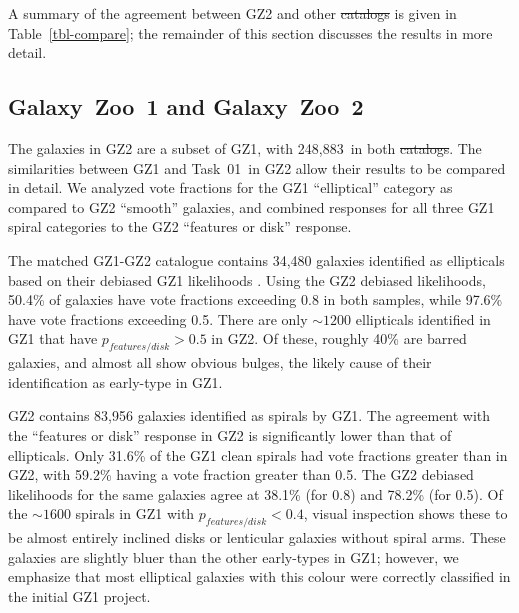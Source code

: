 \documentclass[useAMS,usenatbib]{mn2e}
\providecommand{\DIFaddtex}[1]{{\protect\color{blue}\uwave{#1}}} %
\providecommand{\DIFdeltex}[1]{{\protect\color{red}\sout{#1}}}                      %
\providecommand{\DIFaddbegin}{} %
\providecommand{\DIFaddend}{} %
\providecommand{\DIFdelbegin}{} %
\providecommand{\DIFdelend}{} %
\providecommand{\DIFadd}[1]{\texorpdfstring{\DIFaddtex{#1}}{#1}} %
\providecommand{\DIFdel}[1]{\texorpdfstring{\DIFdeltex{#1}}{}} %
\begin{document}

A summary of the agreement between GZ2 and other \DIFdelbegin \DIFdel{catalogs }\DIFdelend \DIFaddbegin \DIFadd{catalogues }\DIFaddend is given in Table~\ref{tbl-compare}; the remainder of this section discusses the results in more detail. 

\subsection{Galaxy~Zoo~1 and Galaxy~Zoo~2}\label{ssec-gz1gz2}

The galaxies in GZ2 are a subset of GZ1, with 248,883~in both \DIFdelbegin \DIFdel{catalogs}\DIFdelend \DIFaddbegin \DIFadd{catalogues}\DIFaddend . The similarities between GZ1 and Task~01~in GZ2 allow their results to be compared in detail. We analyzed vote fractions for the GZ1 ``elliptical'' category as compared to GZ2 ``smooth'' galaxies, and combined responses for all three GZ1 spiral categories to the GZ2 ``features or disk'' response. 

The matched GZ1-GZ2 catalogue contains 34,480 galaxies identified as ellipticals based on their debiased GZ1 likelihoods \citep{lin11}. Using the GZ2 debiased likelihoods, 50.4\% of galaxies have vote fractions exceeding 0.8 in both samples, while 97.6\% have vote fractions exceeding 0.5. There are only $\sim1200$ ellipticals identified in GZ1 that have $p_{features/disk}>0.5$ in GZ2. Of these, roughly 40\% are barred galaxies, and almost all show obvious bulges, the likely cause of their identification as early-type in GZ1. 

GZ2 contains 83,956 galaxies identified as spirals by GZ1. The agreement with the ``features or disk'' response in GZ2 is significantly lower than that of ellipticals. Only 31.6\% of the GZ1 clean spirals had vote fractions greater than in GZ2, with 59.2\% having a vote fraction greater than 0.5. The GZ2 debiased likelihoods for the same galaxies agree at 38.1\% (for 0.8) and 78.2\% (for 0.5). Of the $\sim1600$ spirals in GZ1 with $p_{features/disk}<0.4$, visual inspection shows these to be almost entirely inclined disks or lenticular galaxies without spiral arms. These galaxies are slightly bluer than the other early-types in GZ1; however, we emphasize that most elliptical galaxies with this colour \citep{sch09} were correctly classified in the initial GZ1 project. 
\end{document}
